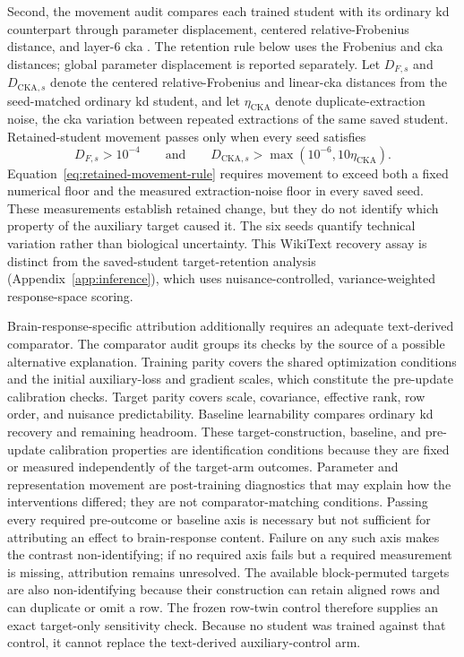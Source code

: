 Second, the movement audit compares each trained student with its ordinary \ac{kd} counterpart through parameter displacement, centered relative-Frobenius distance, and layer-6 \ac{cka} \autocite{kornblith2019}.
The retention rule below uses the Frobenius and \ac{cka} distances; global parameter displacement is reported separately.
Let \(D_{F,s}\) and \(D_{\mathrm{CKA},s}\) denote the centered relative-Frobenius and linear-\ac{cka} distances from the seed-matched ordinary \ac{kd} student, and let \(\eta_{\mathrm{CKA}}\) denote duplicate-extraction noise, the \ac{cka} variation between repeated extractions of the same saved student.
Retained-student movement passes only when every seed satisfies
\begin{equation}
D_{F,s} > 10^{-4} %
\qquad\text{and}\qquad
D_{\mathrm{CKA},s} > \max\!\left(10^{-6}, 10\eta_{\mathrm{CKA}}\right). %
\label{eq:retained-movement-rule}
\end{equation}
Equation~\ref{eq:retained-movement-rule} requires movement to exceed both a fixed numerical floor and the measured extraction-noise floor in every saved seed.
These measurements establish retained change, but they do not identify which property of the auxiliary target caused it.
The six seeds quantify technical variation rather than biological uncertainty.
This WikiText recovery assay is distinct from the saved-student target-retention analysis (Appendix~\ref{app:inference}), which uses nuisance-controlled, variance-weighted response-space scoring.

Brain-response-specific attribution additionally requires an adequate text-derived comparator.
The comparator audit groups its checks by the source of a possible alternative explanation.
Training parity covers the shared optimization conditions and the initial auxiliary-loss and gradient scales, which constitute the pre-update calibration checks.
Target parity covers scale, covariance, effective rank, row order, and nuisance predictability.
Baseline learnability compares ordinary \ac{kd} recovery and remaining headroom.
These target-construction, baseline, and pre-update calibration properties are identification conditions because they are fixed or measured independently of the target-arm outcomes.
Parameter and representation movement are post-training diagnostics that may explain how the interventions differed; they are not comparator-matching conditions.
Passing every required pre-outcome or baseline axis is necessary but not sufficient for attributing an effect to brain-response content.
Failure on any such axis makes the contrast non-identifying; if no required axis fails but a required measurement is missing, attribution remains unresolved.
The available block-permuted targets are also non-identifying because their construction can retain aligned rows and can duplicate or omit a row.
The frozen row-twin control therefore supplies an exact target-only sensitivity check.
Because no student was trained against that control, it cannot replace the text-derived auxiliary-control arm.

